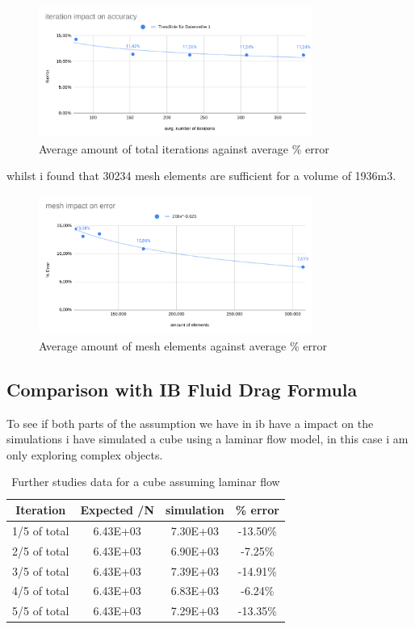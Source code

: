 \documentclass[12pt,a4paper]{article}
\begin{document}
\begin{figure}[H]
\centering
\includegraphics[width=0.8\textwidth]{image11.png}
\caption{Average amount of total iterations against average \% error}
\label{fig:iterations_final}
\end{figure}

whilst i found that 30234 mesh elements are sufficient for a volume of 1936m3.

\begin{figure}[H]
\centering
\includegraphics[width=0.8\textwidth]{image2.png}
\caption{Average amount of mesh elements against average \% error}
\label{fig:mesh_final}
\end{figure}

\subsection{Comparison with IB Fluid Drag Formula}

To see if both parts of the assumption we have in ib have a impact on the simulations i have simulated a cube using a laminar flow model, in this case i am only exploring complex objects. 

\begin{table}[H]
\centering
\caption{Further studies data for a cube assuming laminar flow}
\label{tab:laminar_cube}
\begin{tabular}{|c|c|c|c|}
\hline
\rowcolor{lightblue}
\textbf{Iteration} & \textbf{Expected /N} & \textbf{simulation} & \textbf{\% error} \\
\hline
1/5 of total & 6.43E+03 & 7.30E+03 & -13.50\% \\
\hline
2/5 of total & 6.43E+03 & 6.90E+03 & -7.25\% \\
\hline
3/5 of total & 6.43E+03 & 7.39E+03 & -14.91\% \\
\hline
4/5 of total & 6.43E+03 & 6.83E+03 & -6.24\% \\
\hline
5/5 of total & 6.43E+03 & 7.29E+03 & -13.35\% \\
\hline
\end{tabular}
\end{table}
\end{document}
